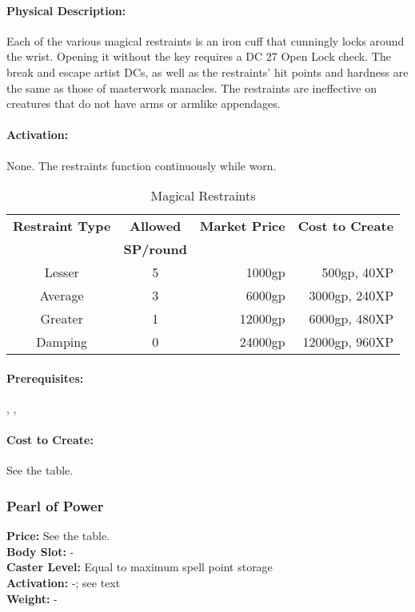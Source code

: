 \paragraph{Physical Description:} Each of the various magical restraints is an iron cuff that cunningly locks around the wrist. Opening it without the key requires a DC 27 Open Lock check. The break and escape artist DCs, as well as the restraints' hit points and hardness are the same as those of masterwork manacles. The restraints are ineffective on creatures that do not have arms or armlike appendages.

\paragraph{Activation:} None. The restraints function continuously while worn.

\begin{table*}
\caption{Magical Restraints}
\label{tab:MagicalRestraints}
\centering
\begin{tabular}{|c|c|r|r|}
\hline
\textbf{Restraint Type}&\textbf{Allowed}&\textbf{Market Price}&\textbf{Cost to Create}\\
&\textbf{ SP/round}&&\\
\hline
Lesser&5&1000gp&500gp, 40XP\\
Average&3&6000gp&3000gp, 240XP\\
Greater&1&12000gp&6000gp, 480XP\\
Damping&0&24000gp&12000gp, 960XP\\
\hline
\end{tabular}
\end{table*}

\paragraph{Prerequisites:} , , 

\paragraph{Cost to Create:} See the  table.


\subsubsection{Pearl of Power}
\label{Item:PearlOfPower}
\textbf{Price:} See the  table.\\
\textbf{Body Slot:} -\\
\textbf{Caster Level:} Equal to maximum spell point storage\\
\textbf{Activation:} -; see text\\
\textbf{Weight:} -

